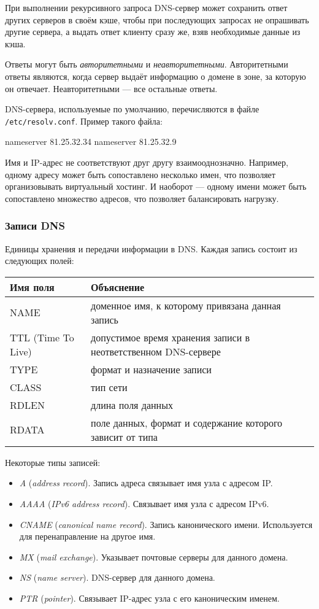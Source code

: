 При выполнении рекурсивного запроса DNS-сервер может сохранить ответ других серверов в своём кэше, чтобы при последующих запросах не опрашивать другие сервера, а выдать ответ клиенту сразу же, взяв необходимые данные из кэша.

Ответы могут быть \emph{авторитетными} и \emph{неавторитетными}. Авторитетными ответы являются, когда сервер выдаёт информацию о домене в зоне, за которую он отвечает. Неавторитетными — все остальные ответы.

DNS-сервера, используемые по умолчанию, перечисляются в файле \lstinline{/etc/resolv.conf}. Пример такого файла:
\begin{plainlst}{}{}
nameserver 81.25.32.34
nameserver 81.25.32.9
\end{plainlst}

Имя и IP-адрес не соответствуют друг другу взаимооднозначно. Например, одному адресу может быть сопоставлено несколько имен, что позволяет организовывать виртуальный хостинг. И наоборот --- одному имени может быть сопоставлено множество адресов, что позволяет балансировать нагрузку.

\subsubsection{Записи DNS}
Единицы хранения и передачи информации в DNS. Каждая запись состоит из следующих полей:

\begin{center}
  \begin{tabular}{lp{9cm}}
    \toprule
    Имя поля & Объяснение \\
    \midrule
    NAME & доменное имя, к которому привязана данная запись \\
    TTL (Time To Live) & допустимое время хранения записи в неответственном DNS-сервере \\
    TYPE & формат и назначение записи \\
    CLASS & тип сети \\
    RDLEN & длина поля данных \\
    RDATA & поле данных, формат и содержание которого зависит от типа \\
    \bottomrule
  \end{tabular}
\end{center}

Некоторые типы записей:
\begin{itemize}
  \item \emph{A} (\emph{address record}). Запись адреса связывает имя узла с адресом IP.
  \item \emph{AAAA} (\emph{IPv6 address record}). Связывает имя узла с адресом IPv6.
  \item \emph{CNAME} (\emph{canonical name record}). Запись канонического имени. Используется для перенаправление на другое имя.
  \item \emph{MX} (\emph{mail exchange}). Указывает почтовые серверы для данного домена.
  \item \emph{NS} (\emph{name server}). DNS-сервер для данного домена.
  \item \emph{PTR} (\emph{pointer}). Связывает IP-адрес узла с его каноническим именем.
\end{itemize}

